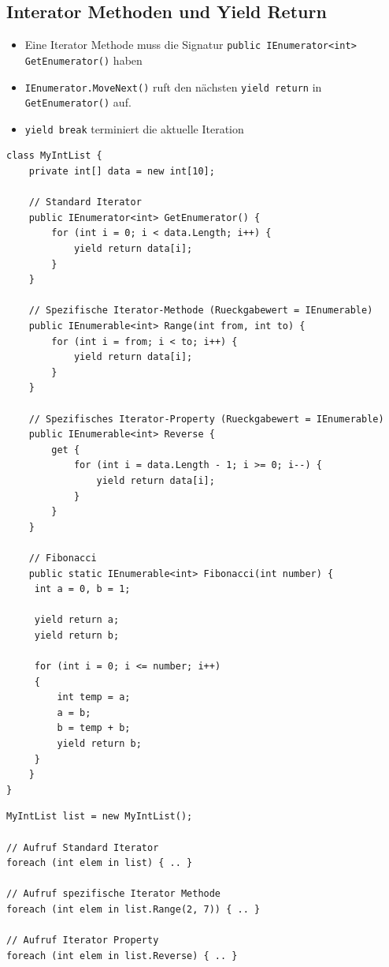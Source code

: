 \clearpage

\subsection{Interator Methoden und Yield Return}
\begin{itemize}
	\item Eine Iterator Methode muss die Signatur \lstinline[]|public IEnumerator<int> GetEnumerator()| haben
	\item \lstinline|IEnumerator.MoveNext()| ruft den nächsten \lstinline|yield return| in \lstinline|GetEnumerator()| auf.
	\item \lstinline|yield break| terminiert die aktuelle Iteration
\end{itemize}
\begin{lstlisting}
class MyIntList {
	private int[] data = new int[10];
	
	// Standard Iterator
	public IEnumerator<int> GetEnumerator() {
		for (int i = 0; i < data.Length; i++) {
			yield return data[i];
		}
	}
	
	// Spezifische Iterator-Methode (Rueckgabewert = IEnumerable)
	public IEnumerable<int> Range(int from, int to) {
		for (int i = from; i < to; i++) {
			yield return data[i];
		}
	}
	
	// Spezifisches Iterator-Property (Rueckgabewert = IEnumerable)
	public IEnumerable<int> Reverse {
		get {
			for (int i = data.Length - 1; i >= 0; i--) {
				yield return data[i];
			}
		}
	}
	
	// Fibonacci
	public static IEnumerable<int> Fibonacci(int number) {
	 int a = 0, b = 1;
	 
	 yield return a;
	 yield return b;
	 
	 for (int i = 0; i <= number; i++)
	 {
		 int temp = a;
		 a = b;
		 b = temp + b;
		 yield return b;
	 }	 
	}
}
\end{lstlisting}

\begin{lstlisting}
MyIntList list = new MyIntList();

// Aufruf Standard Iterator
foreach (int elem in list) { .. }

// Aufruf spezifische Iterator Methode
foreach (int elem in list.Range(2, 7)) { .. }

// Aufruf Iterator Property
foreach (int elem in list.Reverse) { .. }
\end{lstlisting}

\clearpage

